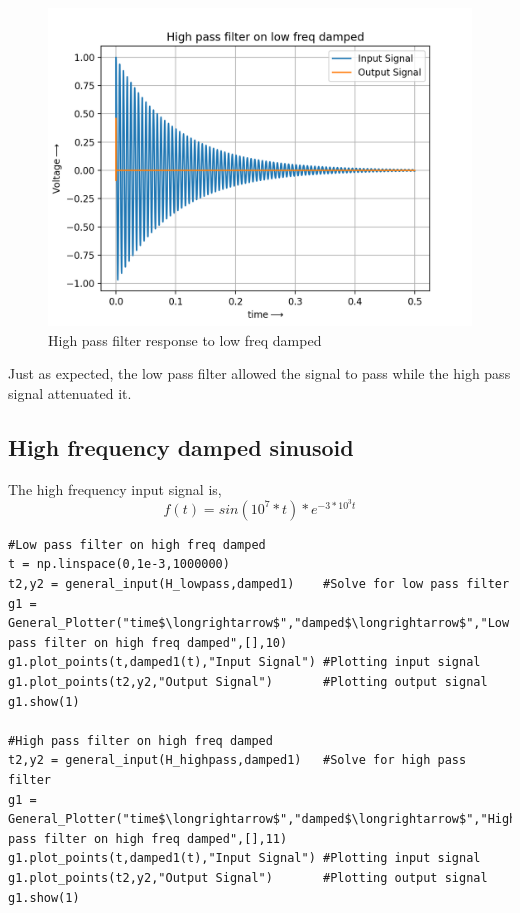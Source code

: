 \documentclass[11pt, a4paper]{article}
\begin{document}
\begin{figure}[!tbh]
   	\centering
   	\includegraphics[scale=0.5]{high_pass_low_damped.png}   
   	\caption{High pass filter response to low freq damped}
   	\label{fig:Figure_1}
\end{figure}
Just as expected, the low pass filter allowed the signal to pass while the high pass signal attenuated it.

\subsection{High frequency damped sinusoid}
The high frequency input signal is,
\begin{equation}
    f(t) = sin(10^7*t)*e^{-3*10^3t}
\end{equation}
\begin{lstlisting}
#Low pass filter on high freq damped
t = np.linspace(0,1e-3,1000000)
t2,y2 = general_input(H_lowpass,damped1)	#Solve for low pass filter
g1 = General_Plotter("time$\longrightarrow$","damped$\longrightarrow$","Low pass filter on high freq damped",[],10)
g1.plot_points(t,damped1(t),"Input Signal")	#Plotting input signal
g1.plot_points(t2,y2,"Output Signal")		#Plotting output signal
g1.show(1)

#High pass filter on high freq damped
t2,y2 = general_input(H_highpass,damped1)	#Solve for high pass filter
g1 = General_Plotter("time$\longrightarrow$","damped$\longrightarrow$","High pass filter on high freq damped",[],11)
g1.plot_points(t,damped1(t),"Input Signal")	#Plotting input signal
g1.plot_points(t2,y2,"Output Signal")		#Plotting output signal
g1.show(1)
\end{lstlisting}
\end{document}
